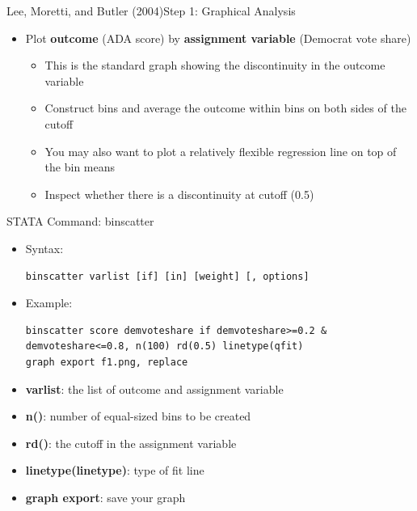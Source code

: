 \documentclass[hyperref={pdfpagelabels=false}]{beamer}
\begin{document}
\begin{frame}{Lee, Moretti, and Butler (2004)}{Step 1: Graphical Analysis}
	\begin{itemize}
		\item Plot \textbf{outcome} (ADA score) by \textbf{assignment variable} (Democrat vote share)
		\vspace{0.2cm}
		\begin{itemize}
			\item This is the standard graph showing the discontinuity in the outcome
			variable
			\vspace{0.2cm}
			\item Construct bins and average the outcome within bins on both
			sides of the cutoff 
			\vspace{0.2cm}
			\item You may also want to plot a relatively flexible regression line
			on top of the bin means
			\vspace{0.2cm}
			\item Inspect whether there is a discontinuity at cutoff (0.5)
		\end{itemize}
	\end{itemize}
\end{frame}


\begin{frame}[fragile]{STATA Command: binscatter}
	\begin{itemize}
		\item Syntax:
\begin{lstlisting}
binscatter varlist [if] [in] [weight] [, options]
\end{lstlisting}
		
		\item Example:
\begin{lstlisting}
binscatter score demvoteshare if demvoteshare>=0.2 & demvoteshare<=0.8, n(100) rd(0.5) linetype(qfit) 
graph export f1.png, replace
\end{lstlisting}
		
		\vspace{0.2cm}
		\item  \textbf{varlist}: the list of outcome and assignment variable
		\vspace{0.2cm}
		\item \textbf{n()}: number of equal-sized bins to be created
		\vspace{0.2cm}
		\item \textbf{rd()}: the cutoff in the assignment variable
		\vspace{0.2cm}
		\item \textbf{linetype(linetype)}: type of fit line
		\vspace{0.2cm}
		\item \textbf{graph export}: save your graph
	\end{itemize}
\end{frame}
\end{document}
